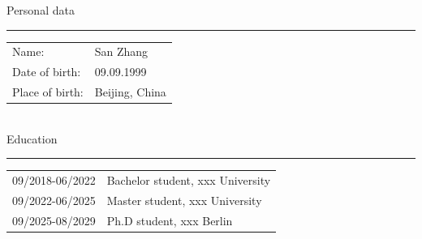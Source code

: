 \documentclass[a4paper,11pt,UTF8,openright]{book}
\begin{document}
\noindent Personal data

\noindent\rule{\textwidth}{0.4pt}

\vskip 0.1in

\begin{tabular}{p{}p{}}
	Name: & San Zhang \\
	Date of birth: & 09.09.1999 \\
	Place of birth: & Beijing, China \\
\end{tabular} \\

\noindent Education

\noindent\rule{\textwidth}{0.4pt}

\vskip 0.1in

\begin{tabular}{p{}p{}}
	09/2018-06/2022 & Bachelor student, xxx University \\
	09/2022-06/2025 & Master student, xxx University \\
	09/2025-08/2029 & Ph.D student, xxx Berlin \\
\end{tabular} \\
\end{document}
